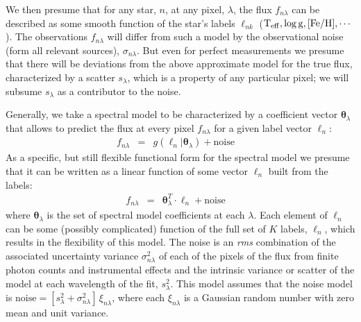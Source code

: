 \documentclass[12pt, preprint]{aastex}
\newcommand{\set}[1]{\bm{#1}}
\newcommand{\starlabel}{\ell}
\newcommand{\starlabelvec}{\set{\starlabel}}
\newcommand{\teff}{\mbox{$\rm T_{eff}$}}
\newcommand{\feh}{\mbox{$\rm [Fe/H]$}}
\newcommand{\logg}{\mbox{$\rm \log g$}}
\newcommand{\noise}{\sigma_{n\lambda}}
\newcommand{\scatter}{s_{\lambda}}
\begin{document}
We then presume that for any star, $n$, at any pixel, $\lambda$,
the flux $f_{n\lambda}$  can be described as some smooth function of the star's labels $\starlabel_{nk}$
($\teff,\logg,\feh,\cdots$).
The observations $f_{n\lambda}$ will differ from such a model by the observational noise (form all relevant sources), $\noise$. But even for perfect measurements we presume that there will be
deviations from the above approximate model for the true flux, characterized by a scatter $\scatter$,
which is a property of any particular pixel; we will subsume $\scatter$ as a contributor to the noise.

Generally, we take a spectral model to be characterized by a coefficient vector $\set{\theta}_\lambda$
that allows to predict the flux at every pixel $f_{n\lambda}$ for a given label vector 
$\starlabelvec_n$:
\begin{eqnarray}
f_{n\lambda} &=&
g(\starlabelvec_n |  \set{\theta}_\lambda) + \mbox{noise}
\label{eq:specmodel}\quad 
\end{eqnarray}
As a specific, but still flexible functional form for the spectral model we presume that it can be written as
a linear function of some vector $\starlabelvec_n$ built from the labels: 
\begin{eqnarray}
f_{n\lambda} &=&
\set{\theta}_\lambda^T \cdot \starlabelvec_n + \mbox{noise}
\label{eq:linearmodel}\quad
\end{eqnarray}
where $\set{\theta}_\lambda$ is the set of spectral model coefficients at each $\lambda$. Each element of $\starlabelvec_n$ can be some (possibly complicated) function of the full set of $K$ labels, $\starlabelvec_n$, which
results in the flexibility of this model. The noise is an \textit{rms} combination of the associated uncertainty variance
$\sigma_{n\lambda}^2$ of each of the pixels of the flux from finite photon counts and instrumental effects and the intrinsic variance or scatter of the model at each wavelength of the fit, $s_\lambda^2$.
This model assumes that the noise model is
$\mbox{noise} = [s_\lambda^2+ \sigma_{n\lambda}^2]\,\xi_{n\lambda}$,
where each $\xi_{n\lambda}$ is a Gaussian random number with zero mean and unit
variance.
\end{document}
